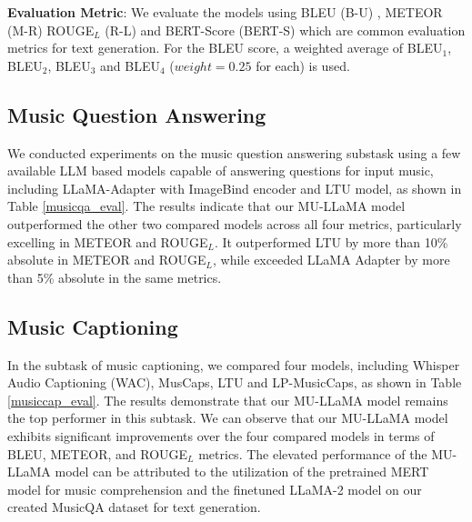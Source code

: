 \documentclass{article}
\begin{document}
\noindent
\textbf{Evaluation Metric}: We evaluate the models using BLEU (B-U) \cite{papineni-etal-2002-bleu}, METEOR (M-R) \cite{banerjee-lavie-2005-meteor} ROUGE$_L$ (R-L) \cite{lin-2004-rouge} and BERT-Score (BERT-S) \cite{bert-score} which are common evaluation metrics for text generation. For the BLEU score, a weighted average of BLEU$_1$, BLEU$_2$, BLEU$_3$ and BLEU$_4$ ($weight = 0.25$ for each) is used.

\vspace{-0.2cm}
\subsection{Music Question Answering}
\label{ssec:musicqa_exp}

\noindent
We conducted experiments on the music question answering substask using a few available LLM based models capable of answering questions for input music, including LLaMA-Adapter \cite{zhang2023llamaadapter,gao2023llamaadapter} with ImageBind encoder and LTU model, as shown in Table \ref{musicqa_eval}. The results indicate that our MU-LLaMA model outperformed the other two compared models across all four metrics, particularly excelling in METEOR and ROUGE$_L$. It outperformed LTU by more than 10\% absolute in METEOR and ROUGE$_L$, while exceeded LLaMA Adapter by more than 5\% absolute in the same metrics.


\vspace{-0.3cm}
\subsection{Music Captioning}
\label{ssec:musiccap_exp}

\noindent
In the subtask of music captioning, we compared four models, including Whisper Audio Captioning (WAC), MusCaps, LTU and LP-MusicCaps, as shown in Table \ref{musiccap_eval}. The results demonstrate that our MU-LLaMA model remains the top performer in this subtask. We can observe that our MU-LLaMA model exhibits significant improvements over the four compared models in terms of BLEU, METEOR, and ROUGE$_L$ metrics. The elevated performance of the MU-LLaMA model can be attributed to the utilization of the pretrained MERT model for music comprehension and the finetuned LLaMA-2 model on our created MusicQA dataset for text generation.
\end{document}
